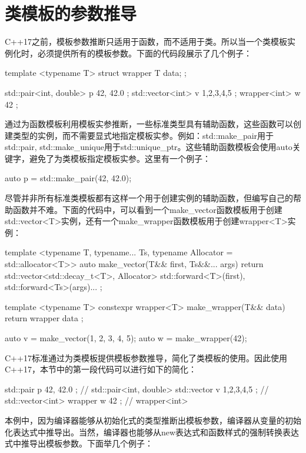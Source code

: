\section{类模板的参数推导}
C++17之前，模板参数推断只适用于函数，而不适用于类。所以当一个类模板实例化时，必须提供所有的模板参数。下面的代码段展示了几个例子：

\begin{cppcode}
template <typename T>
struct wrapper
{
	T data;
};

std::pair<int, double> p{ 42, 42.0 };
std::vector<int> v{ 1,2,3,4,5 };
wrapper<int> w{ 42 };
\end{cppcode}

通过为函数模板利用模板实参推断，一些标准类型具有辅助函数，这些函数可以创建类型的实例，而不需要显式地指定模板实参。例如：std::make_pair用于std::pair, std::make_unique用于std::unique_ptr。这些辅助函数模板会使用auto关键字，避免了为类模板指定模板实参。这里有一个例子：

\begin{cppcode}
auto p = std::make_pair(42, 42.0);
\end{cppcode}

尽管并非所有标准类模板都有这样一个用于创建实例的辅助函数，但编写自己的帮助函数并不难。下面的代码中，可以看到一个make_vector函数模板用于创建std::vector<T>实例，还有一个make_wrapper函数模板用于创建wrapper<T>实例：

\begin{cppcode}
template <typename T, typename... Ts,
typename Allocator = std::allocator<T>>
auto make_vector(T&& first, Ts&&... args)
{
	return std::vector<std::decay_t<T>, Allocator> {
		std::forward<T>(first),
		std::forward<Ts>(args)...
	};
}

template <typename T>
constexpr wrapper<T> make_wrapper(T&& data)
{
	return wrapper{ data };
}

auto v = make_vector(1, 2, 3, 4, 5);
auto w = make_wrapper(42);
\end{cppcode}

C++17标准通过为类模板提供模板参数推导，简化了类模板的使用。因此使用C++17，本节中的第一段代码可以进行如下的简化：

\begin{cppcode}
std::pair p{ 42, 42.0 }; // std::pair<int, double>
std::vector v{ 1,2,3,4,5 }; // std::vector<int>
wrapper w{ 42 }; // wrapper<int>
\end{cppcode}

本例中，因为编译器能够从初始化式的类型推断出模板参数，编译器从变量的初始化表达式中推导出。当然，编译器也能够从new表达式和函数样式的强制转换表达式中推导出模板参数。下面举几个例子：

